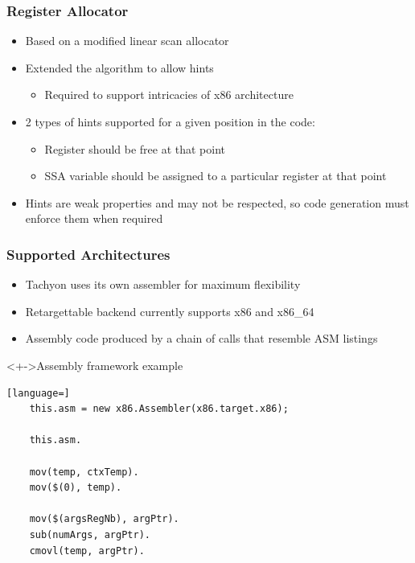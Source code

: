 \begin{frame}
\frametitle{\bf Register Allocator}

\begin{itemize}
    \item Based on a modified linear scan allocator
    \item Extended the algorithm to allow hints
    \begin{itemize}
        \item Required to support intricacies of x86 architecture
    \end{itemize}
    \item 2 types of hints supported for a given position in the code:
    \begin{itemize}
        \item Register should be free at that point
        \item SSA variable should be assigned to a particular register at that point
    \end{itemize}
    \item Hints are weak properties and may not be respected, so code generation must enforce
    them when required
\end{itemize}
\end{frame}

\begin{frame}[fragile]
\frametitle{\bf Supported Architectures}

\begin{itemize}
    \item Tachyon uses its own assembler for maximum flexibility
    \item Retargettable backend currently supports x86 and x86\_64
    \item Assembly code produced by a chain of calls that resemble ASM
    listings
\end{itemize}

\begin{block}<+->{Assembly framework example}
\begin{lstlisting}[language=]
    this.asm = new x86.Assembler(x86.target.x86);

    this.asm.

    mov(temp, ctxTemp).
    mov($(0), temp).
    
    mov($(argsRegNb), argPtr).
    sub(numArgs, argPtr).
    cmovl(temp, argPtr).
\end{lstlisting}
\end{block}
\end{frame}

